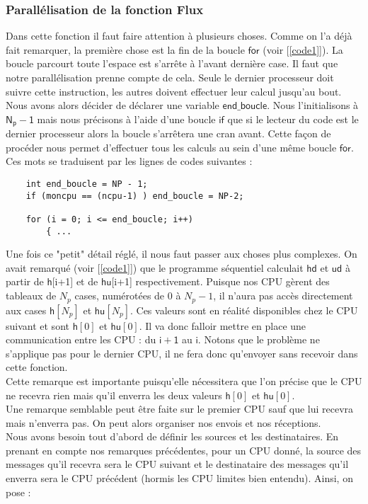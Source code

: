 \documentclass[french]{article}
\newcommand{\choco}{\color{choco}}
\newcommand{\bk}{\color{black}}
\begin{document}
\choco \subsubsection*{Parallélisation de la fonction Flux} \bk
Dans cette fonction il faut faire attention à plusieurs choses. Comme on l'a déjà fait remarquer, la première chose est la fin de la boucle $\mathsf{for}$ (voir [\ref{code1}]). La boucle parcourt toute l'espace est s'arrête à l'avant dernière case. Il faut que notre parallélisation prenne compte de cela. Seule le dernier processeur doit suivre cette instruction, les autres doivent effectuer leur calcul jusqu'au bout. Nous avons alors décider de déclarer une variable $\mathsf{end\_ boucle}$. Nous l'initialisons à $\mathsf{N_p -1}$ mais nous précisons à l'aide d'une boucle $\mathsf{if}$ que si le lecteur du code est le dernier processeur alors la boucle s'arrêtera une cran avant. Cette façon de procéder nous permet d'effectuer tous les calculs au sein d'une même boucle $\mathsf{for}$. Ces mots se traduisent par les lignes de codes suivantes :
\begin{minipage}{455 pt}
\begin{lstlisting}
	int end_boucle = NP - 1;
  	if (moncpu == (ncpu-1) ) end_boucle = NP-2;
    
  	for (i = 0; i <= end_boucle; i++)
  		{ ...
\end{lstlisting}
\end{minipage} 

Une fois ce "petit" détail réglé, il nous faut passer aux choses plus complexes. On avait remarqué (voir [\ref{code1}]) que le programme séquentiel calculait $\mathsf{hd}$ et $\mathsf{ud}$ à partir de $\mathsf{h}$[i+1] et de $\mathsf{hu}$[i+1] respectivement. Puisque nos CPU gèrent des tableaux de $N_p$ cases, numérotées de $0$ à $N_p-1$, il n'aura pas accès directement aux cases $\mathsf{h}[N_p]$ et $\mathsf{hu}[N_p]$. Ces valeurs sont en réalité disponibles chez le CPU suivant et sont $\mathsf{h}[0]$ et $\mathsf{hu}[0]$. Il va donc falloir mettre en place une communication entre les CPU : du $\mathsf{i+1}$ au $\mathsf{i}$. Notons que le problème ne s'applique pas pour le dernier CPU, il ne fera donc qu'envoyer sans recevoir dans cette fonction. \\
Cette remarque est importante puisqu'elle nécessitera que l'on précise que le CPU ne recevra rien mais qu'il enverra les deux valeurs $\mathsf{h}[0]$ et $\mathsf{hu}[0]$.\\
Une remarque semblable peut être faite sur le premier CPU sauf que lui recevra mais n'enverra pas. On peut alors organiser nos envois et nos réceptions.\\
Nous avons besoin tout d'abord de définir les sources et les destinataires. En prenant en compte nos remarques précédentes, pour un CPU donné, la source des messages qu'il recevra sera le CPU suivant et le destinataire des messages qu'il enverra sera le CPU précédent (hormis les CPU limites bien entendu). Ainsi, on pose :
\end{document}
